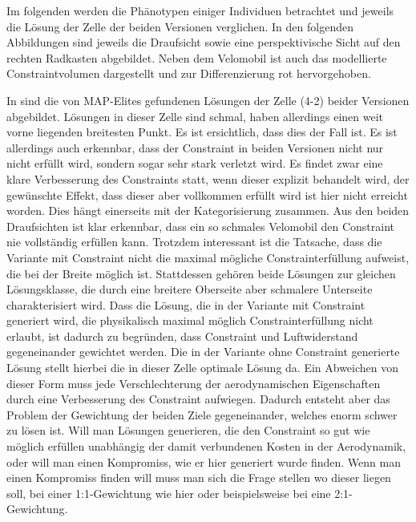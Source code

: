 
Im folgenden werden die Phänotypen einiger Individuen betrachtet und jeweils die Lösung der Zelle der beiden Versionen verglichen.
In den folgenden Abbildungen sind jeweils die Draufsicht sowie eine perspektivische Sicht auf den rechten Radkasten abgebildet.
Neben dem Velomobil ist auch das modellierte Constraintvolumen dargestellt und zur Differenzierung rot hervorgehoben.


In  sind die von MAP-Elites gefundenen Lösungen der Zelle (4-2) beider Versionen abgebildet.
Lösungen in dieser Zelle sind schmal, haben allerdings einen weit vorne liegenden breitesten Punkt.
Es ist ersichtlich, dass dies der Fall ist.
Es ist allerdings auch erkennbar, dass der Constraint in beiden Versionen nicht nur nicht erfüllt wird, sondern sogar sehr stark verletzt wird.
Es findet zwar eine klare Verbesserung des Constraints statt, wenn dieser explizit behandelt wird, der gewünschte Effekt, dass dieser aber vollkommen erfüllt wird ist hier nicht erreicht worden.
Dies hängt einerseits mit der Kategorisierung zusammen. Aus den beiden Draufsichten ist klar erkennbar, dass ein so schmales Velomobil den Constraint nie vollständig erfüllen kann.
Trotzdem interessant ist die Tatsache, dass die Variante mit Constraint nicht die maximal mögliche Constrainterfüllung aufweist, die bei der Breite möglich ist.
Stattdessen gehören beide Lösungen zur gleichen Lösungsklasse, die durch eine breitere Oberseite aber schmalere Unterseite charakterisiert wird.
Dass die Lösung, die in der Variante mit Constraint generiert wird, die physikalisch maximal möglich Constrainterfüllung nicht erlaubt, ist dadurch zu begründen, dass Constraint und Luftwiderstand gegeneinander gewichtet werden.
Die in der Variante ohne Constraint generierte Lösung stellt hierbei die in dieser Zelle optimale Lösung da.
Ein Abweichen von dieser Form muss jede Verschlechterung der aerodynamischen Eigenschaften durch eine Verbesserung des Constraint aufwiegen.
Dadurch entsteht aber das Problem der Gewichtung der beiden Ziele gegeneinander, welches enorm schwer zu lösen ist.
Will man Lösungen generieren, die den Constraint so gut wie möglich erfüllen unabhängig der damit verbundenen Kosten in der Aerodynamik, oder will man einen Kompromiss, wie er hier generiert wurde finden.
Wenn man einen Kompromiss finden will muss man sich die Frage stellen wo dieser liegen soll, bei einer 1:1-Gewichtung wie hier oder beispielsweise bei eine 2:1-Gewichtung.


